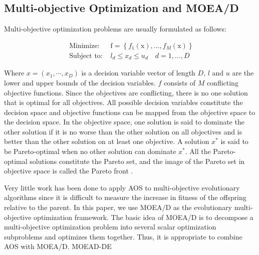 \documentclass[journal]{IEEEtran}
\newcommand{\TODO}[1]{\textcolor[rgb]{1.00,0.40,0.22}{#1}}
\begin{document}
\subsection{Multi-objective Optimization and MOEA/D}
Multi-objective optimization problems are usually formulated as follows:

\begin{equation}
  \begin{array}{ll}
    \text { Minimize: }   & \mathrm{f}=\left\{f_{1}(\mathrm{x}), \ldots, f_{M}(\mathrm{x})\right\} \\
    \text { Subject to: } & l_{d} \leq x_{d} \leq u_{d} \quad d=1, \ldots, D
  \end{array}
  \label{eq: moea}
\end{equation}

Where $x = (x_1, \cdots , x_D)$ is a decision variable vector of length $D$, $l$ and $u$ are the lower and upper bounds of the decision variables. $f$ consists of $M$ conflicting objective functions. Since the objectives are conflicting, there is no one solution that is optimal for all objectives.
All possible decision variables constitute the decision space and objective functions can be mapped from the objective space to the decision space\cite{gonccalves2017adaptive}. In the objective space, one solution is said to dominate the other solution if it is no worse than the other solution on all objectives and is better than the other solution on at least one objective.
A solution $x^*$ is said to be Pareto-optimal when no other solution can dominate $x^*$. All the Pareto-optimal solutions constitute the Pareto set, and the image of the Pareto set in objective space is called the Pareto front \cite{deb2001multi}.

Very little work has been done to apply AOS to multi-objective evolutionary algorithms since it is difficult to measure the increase in fitness of the offspring relative to the parent.
In this paper, we use MOEA/D \cite{moead} as the evolutionary multi-objective optimization framework. The basic idea of MOEA/D is to decompose a multi-objective optimization problem into several scalar optimization subproblems and optimizes them together. Thus, it is appropriate to combine AOS with MOEA/D.
\TODO{MOEAD-DE}
\end{document}
